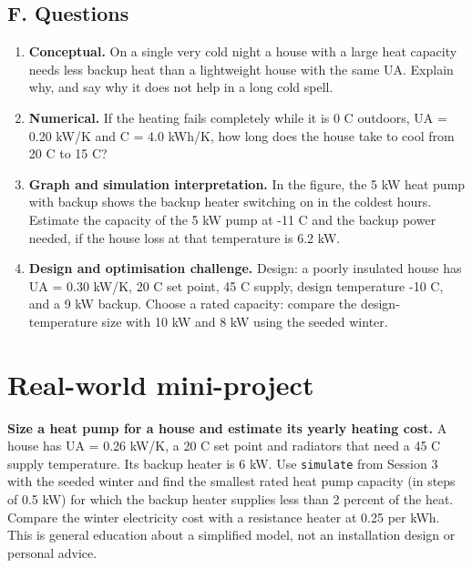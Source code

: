 \documentclass[11pt,a4paper]{article}
\begin{document}
\subsection*{F. Questions}
\begin{enumerate}[nosep]
\item \textbf{Conceptual.} On a single very cold night a house with a large heat capacity needs less backup heat than a lightweight house with the same UA. Explain why, and say why it does not help in a long cold spell.
\item \textbf{Numerical.} If the heating fails completely while it is 0 C outdoors, UA = 0.20 kW/K and C = 4.0 kWh/K, how long does the house take to cool from 20 C to 15 C?
\item \textbf{Graph and simulation interpretation.} In the figure, the 5 kW heat pump with backup shows the backup heater switching on in the coldest hours. Estimate the capacity of the 5 kW pump at -11 C and the backup power needed, if the house loss at that temperature is 6.2 kW.
\item \textbf{Design and optimisation challenge.} Design: a poorly insulated house has UA = 0.30 kW/K, 20 C set point, 45 C supply, design temperature -10 C, and a 9 kW backup. Choose a rated capacity: compare the design-temperature size with 10 kW and 8 kW using the seeded winter.
\end{enumerate}

\section{Real-world mini-project}
\textbf{Size a heat pump for a house and estimate its yearly heating cost.} A house has UA = 0.26 kW/K, a 20 C set point and radiators that need a 45 C supply temperature. Its backup heater is 6 kW. Use \texttt{simulate} from Session 3 with the seeded winter and find the smallest rated heat pump capacity (in steps of 0.5 kW) for which the backup heater supplies less than 2 percent of the heat. Compare the winter electricity cost with a resistance heater at 0.25 per kWh. This is general education about a simplified model, not an installation design or personal advice.
\end{document}
